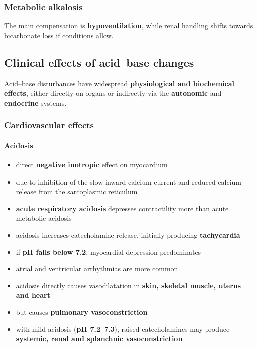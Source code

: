 \documentclass[11pt,a4paper]{article}
\begin{document}
\subsubsection{Metabolic alkalosis}

The main compensation is \textbf{hypoventilation}, while renal handling shifts towards bicarbonate loss if conditions allow.

\subsection{Clinical effects of acid--base changes}

Acid--base disturbances have widespread \textbf{physiological and biochemical effects}, either directly on organs or indirectly via the \textbf{autonomic} and \textbf{endocrine} systems.

\subsubsection{Cardiovascular effects}

\paragraph{Acidosis}
\begin{itemize}
  \item direct \textbf{negative inotropic} effect on myocardium
  \item due to inhibition of the slow inward calcium current and reduced calcium release from the sarcoplasmic reticulum
  \item \textbf{acute respiratory acidosis} depresses contractility more than acute metabolic acidosis
  \item acidosis increases catecholamine release, initially producing \textbf{tachycardia}
  \item if \textbf{pH falls below 7.2}, myocardial depression predominates
  \item atrial and ventricular arrhythmias are more common
  \item acidosis directly causes vasodilatation in \textbf{skin, skeletal muscle, uterus and heart}
  \item but causes \textbf{pulmonary vasoconstriction}
  \item with mild acidosis (\textbf{pH 7.2--7.3}), raised catecholamines may produce \textbf{systemic, renal and splanchnic vasoconstriction}
\end{itemize}
\end{document}
